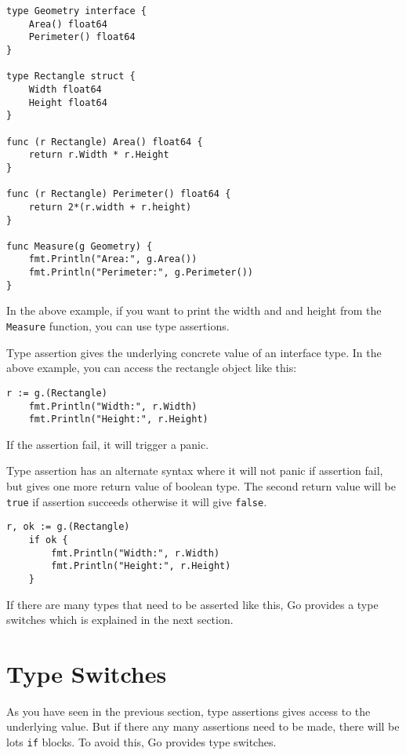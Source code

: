 \begin{lstlisting}[numbers=none]
type Geometry interface {
    Area() float64
    Perimeter() float64
}

type Rectangle struct {
    Width float64
    Height float64
}

func (r Rectangle) Area() float64 {
    return r.Width * r.Height
}

func (r Rectangle) Perimeter() float64 {
    return 2*(r.width + r.height)
}

func Measure(g Geometry) {
    fmt.Println("Area:", g.Area())
    fmt.Println("Perimeter:", g.Perimeter())
}
\end{lstlisting}

In the above example, if you want to print the width and and height
from the \texttt{Measure} function, you can use type assertions.

Type assertion gives the underlying concrete
value of an interface type.  In the above example, you can access the
rectangle object like this:

\begin{lstlisting}[numbers=none]
    r := g.(Rectangle)
    fmt.Println("Width:", r.Width)
    fmt.Println("Height:", r.Height)
\end{lstlisting}

If the assertion fail, it will trigger a panic.

Type assertion has an alternate syntax where it will not panic if
assertion fail, but gives one more return value of boolean type.  The
second return value will be \texttt{true} if assertion succeeds
otherwise it will give \texttt{false}.

\begin{lstlisting}[numbers=none]
    r, ok := g.(Rectangle)
    if ok {
        fmt.Println("Width:", r.Width)
        fmt.Println("Height:", r.Height)
    }
\end{lstlisting}

If there are many types that need to be asserted like this, Go
provides a type switches which is explained in the next section.

\section{Type Switches}

As you have seen in the previous section, type assertions gives access
to the underlying value.  But if there any many assertions need to be
made, there will be lots \texttt{if} blocks.  To avoid this, Go
provides type switches.

